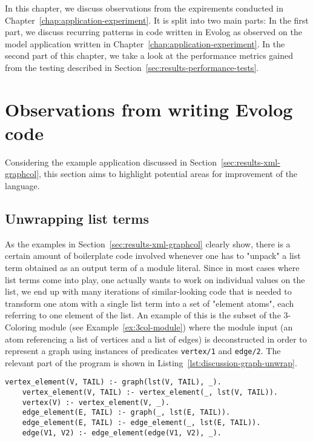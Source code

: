 In this chapter, we discuss observations from the expirements conducted in Chapter~\ref{chap:application-experiment}. It is split into two main parts: In the first part, we discuss recurring patterns in code written in Evolog as observed on the model application written in Chapter~\ref{chap:application-experiment}. In the second part of this chapter, we take a look at the performance metrics gained from the testing described in Section~\ref{sec:results-performance-tests}.

\section{Observations from writing Evolog code}
\label{sec:discussion-language-improvements}

Considering the example application discussed in Section~\ref{sec:results-xml-graphcol}, this section aims to highlight potential areas for improvement of the language.

\subsection{Unwrapping list terms}
As the examples in Section~\ref{sec:results-xml-graphcol} clearly show, there is a certain amount of boilerplate code involved whenever one has to "unpack" a list term obtained as an output term of a module literal. Since in most cases where list terms come into play, one actually wants to work on individual values on the list, we end up with many iterations of similar-looking code that is needed to transform one atom with a single list term into a set of "element atoms", each referring to one element of the list. An example of this is the subset of the 3-Coloring module (see Example~\ref{ex:3col-module}) where the module input (an atom referencing a list of vertices and a list of edges) is deconstructed in order to represent a graph using instances of predicates \texttt{vertex/1} and \texttt{edge/2}. The relevant part of the program is shown in Listing~\ref{lst:discussion-graph-unwrap}.

\begin{lstlisting}[style=asp-code, label={lst:discussion-graph-unwrap}, caption={Unwrapping list terms representing a graph}]
	vertex_element(V, TAIL) :- graph(lst(V, TAIL), _).
	vertex_element(V, TAIL) :- vertex_element(_, lst(V, TAIL)).
	vertex(V) :- vertex_element(V, _).
	edge_element(E, TAIL) :- graph(_, lst(E, TAIL)).
	edge_element(E, TAIL) :- edge_element(_, lst(E, TAIL)).
	edge(V1, V2) :- edge_element(edge(V1, V2), _).
\end{lstlisting}

